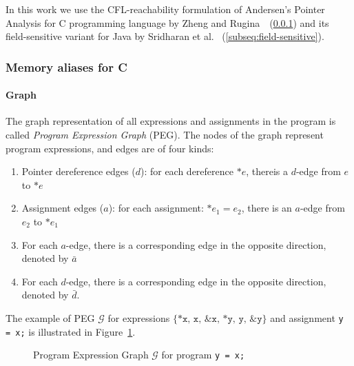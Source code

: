 In this work we use the CFL-reachability formulation of Andersen's Pointer Analysis for C programming language by Zheng and Rugina~\cite{Zheng:2008:DAA:1328897.1328464}~(\ref{subseq:memalias}) and its field-sensitive variant for Java by Sridharan et al. \cite{10.1145/1103845.1094817}~(\ref{subseq:field-sensitive}).

\subsubsection{Memory aliases for C}
\label{subseq:memalias}
\paragraph*{Graph}

The graph representation of all expressions and assignments in the program is called \textit{Program Expression Graph} (PEG). The nodes of the graph represent program expressions, and edges are of four kinds: 
\begin{enumerate}
\item Pointer dereference edges ($d$): for each dereference $*e$, thereis a $d$-edge from $e$ to $*e$
\item Assignment edges ($a$): for each assignment: $*e_1 = e_2$, there is an $a$-edge from $e_2$ to $*e_1$
\item For each $a$-edge, there is a corresponding edge in the opposite direction, denoted by $\bar{a}$
\item For each $d$-edge, there is a corresponding edge in the opposite direction, denoted by $\bar{d}$. 
\end{enumerate}
The example of PEG $\mathcal{G}$ for expressions $\{\texttt{*x, x, \&x, *y, y, \&y}\}$ and assignment \texttt{y = x;} is illustrated in Figure~\ref{fig:example_fsm}.

\begin{figure}[h]
    \centering
    \caption{Program Expression Graph $\mathcal{G}$ for program \texttt{y = x;}}
    \label{fig:example_fsm}
\end{figure}

